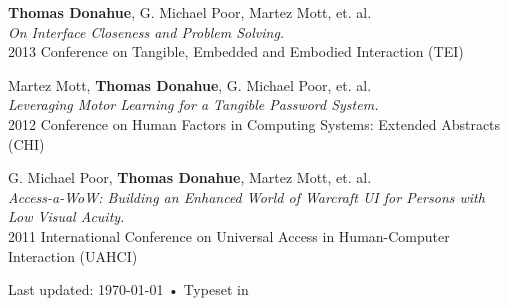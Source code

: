 \documentclass[10pt, letter]{article}
\newcommand{\years}[1]{\marginnote{\footnotesize #1}}
\begin{document}
\vspace{.2cm}
\years{2013} 
\textbf{Thomas Donahue}, G. Michael Poor, Martez Mott, et. al. \\
\textit{On Interface Closeness and Problem Solving.} \\
2013 Conference on Tangible, Embedded and Embodied Interaction
(TEI)

\vspace{.2cm}
\years{2012} 
Martez Mott, \textbf{Thomas Donahue}, G. Michael Poor, et. al. \\
\textit{Leveraging Motor Learning for a Tangible Password System.} \\
2012 Conference on Human Factors in Computing Systems: Extended Abstracts
(CHI)

\vspace{.2cm}
\years{2011} 
G. Michael Poor, \textbf{Thomas Donahue}, Martez Mott, et. al. \\
\textit{Access-a-WoW: Building an Enhanced World of Warcraft
  \uppercase{UI} for Persons with Low Visual Acuity.} \\
2011 International Conference on Universal Access in Human-Computer
Interaction (UAHCI)



\vspace{0.5cm}
\begin{center}
  {\scriptsize  Last updated: \today\- •\-
    Typeset in \href{http://nitens.org/taraborelli/cvtex}{
      \XeTeX }\\

}
\end{center}
\end{document}
